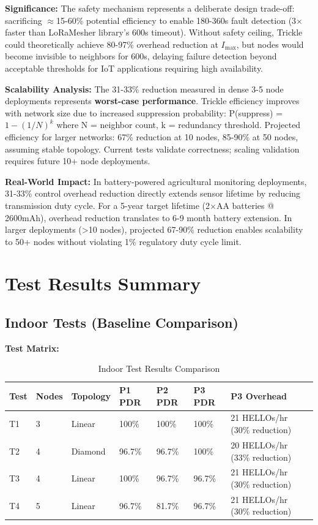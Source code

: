 \textbf{Significance:} The safety mechanism represents a deliberate design trade-off: sacrificing $\approx$15-60\% potential efficiency to enable 180-360s fault detection (3$\times$ faster than LoRaMesher library's 600s timeout). Without safety ceiling, Trickle could theoretically achieve 80-97\% overhead reduction at $I_{\max}$, but nodes would become invisible to neighbors for 600s, delaying failure detection beyond acceptable thresholds for IoT applications requiring high availability.

\textbf{Scalability Analysis:} The 31-33\% reduction measured in dense 3-5 node deployments represents \textbf{worst-case performance}. Trickle efficiency improves with network size due to increased suppression probability: P(suppress) = $1 - (1/N)^k$ where N = neighbor count, k = redundancy threshold. Projected efficiency for larger networks: 67\% reduction at 10 nodes, 85-90\% at 50 nodes, assuming stable topology. Current tests validate correctness; scaling validation requires future 10+ node deployments.

\textbf{Real-World Impact:} In battery-powered agricultural monitoring deployments, 31-33\% control overhead reduction directly extends sensor lifetime by reducing transmission duty cycle. For a 5-year target lifetime (2$\times$AA batteries @ 2600mAh), overhead reduction translates to 6-9 month battery extension. In larger deployments (>10 nodes), projected 67-90\% reduction enables scalability to 50+ nodes without violating 1\% regulatory duty cycle limit.

\section{Test Results Summary}

\subsection{Indoor Tests (Baseline Comparison)}

\textbf{Test Matrix:}

\begin{table}[h]
\centering
\caption{Indoor Test Results Comparison}
\label{tab:indoor-test-results}
\begin{tabular}{lllllll}
\hline
\textbf{Test} & \textbf{Nodes} & \textbf{Topology} & \textbf{P1 PDR} & \textbf{P2 PDR} & \textbf{P3 PDR} & \textbf{P3 Overhead} \\
\hline
T1 & 3 & Linear & 100\% & 100\% & 100\% & 21 HELLOs/hr (30\% reduction) \\
\hline
T2 & 4 & Diamond & 96.7\% & 96.7\% & 100\% & 20 HELLOs/hr (33\% reduction) \\
\hline
T3 & 4 & Linear & 100\% & 96.7\% & 96.7\% & 21 HELLOs/hr (30\% reduction) \\
\hline
T4 & 5 & Linear & 96.7\% & 81.7\% & 96.7\% & 21 HELLOs/hr (30\% reduction) \\
\hline
\end{tabular}
\end{table}

